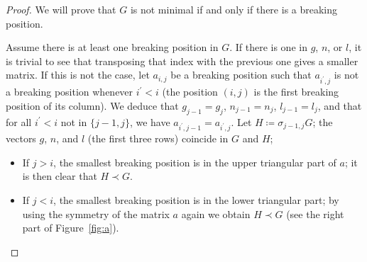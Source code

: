\documentclass{amsart}
\theoremstyle{plain}
\theoremstyle{definition}
\begin{document}
\begin{proof}
  We will prove that $G$ is not minimal if and only if there is a
  breaking position.

  Assume there is at least one breaking position in $G$. If there is
  one in $g$, $n$, or $l$, it is trivial to see that transposing that
  index with the previous one gives a smaller matrix. If this is not
  the case, let $a_{i,j}$ be a breaking position such that
  $a_{i^\prime,j}$ is not a breaking position whenever $i^\prime < i$
  (the position $(i,j)$ is the first breaking position of its
  column). We deduce that $g_{j-1} = g_j$, $n_{j-1} = n_j$, $l_{j-1} =
  l_j$, and that for all $i^\prime < i$ not in $\{j-1,j\}$, we have
  $a_{i^\prime, j-1} = a_{i^\prime, j}$. Let $H \coloneqq
  \sigma_{j-1,j} G$; the vectors $g$, $n$, and $l$ (the first three
  rows) coincide in $G$ and $H$;
  \begin{itemize}
  \item If $j > i$, the smallest breaking position is in the upper
    triangular part of $a$; it is then clear that $H \prec G$.
  \item If $j < i$, the smallest breaking position is in the lower
    triangular part; by using the symmetry of the matrix $a$ again we
    obtain $H \prec G$ (see the right part of Figure~\ref{fig:a}).
  \end{itemize}

  \begin{figure}[t]
\end{figure}
\end{proof}
\end{document}
